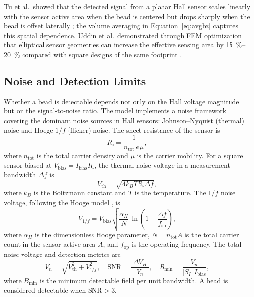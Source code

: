 \documentclass[micromachines,article,submit,pdftex,moreauthors]{Definitions/mdpi}
\begin{document}
Tu et al.\ showed that the detected signal from a planar Hall sensor scales linearly
with the sensor active area when the bead is centered but drops sharply when the
bead is offset laterally \cite{tu2009}; the volume averaging in
Equation~\eqref{eq:avgbz} captures this spatial dependence. Uddin et al.\
demonstrated through FEM optimization that elliptical sensor geometries can increase
the effective sensing area by \SIrange{15}{20}{\percent} compared with square
designs of the same footprint \cite{uddin2022}.

\subsection{Noise and Detection Limits}
\label{sec:noise}

Whether a bead is detectable depends not only on the Hall voltage magnitude but on
the signal-to-noise ratio. The model implements a noise framework covering the
dominant noise sources in Hall sensors: Johnson--Nyquist (thermal) noise and Hooge
$1/f$ (flicker) noise. The sheet resistance of the sensor is
\begin{equation}
R_\square = \frac{1}{n_\text{tot} \, e \, \mu},
\label{eq:rsq}
\end{equation}
where $n_\text{tot}$ is the total carrier density and $\mu$ is the carrier mobility.
For a square sensor biased at $V_\text{bias} = I_\text{bias} R_\square$, the thermal
noise voltage in a measurement bandwidth $\Delta f$ is
\begin{equation}
V_\text{th} = \sqrt{4 k_B T R_\square \Delta f},
\label{eq:thermal}
\end{equation}
where $k_B$ is the Boltzmann constant and $T$ is the temperature. The $1/f$ noise
voltage, following the Hooge model \cite{xu2013,huang2014}, is
\begin{equation}
V_{1/f} = V_\text{bias}\sqrt{\frac{\alpha_H}{N}\,
\ln\!\left(1 + \frac{\Delta f}{f_\text{op}}\right)},
\label{eq:flicker}
\end{equation}
where $\alpha_H$ is the dimensionless Hooge parameter,
$N = n_\text{tot} A$ is the total carrier count in the sensor active area $A$, and
$f_\text{op}$ is the operating frequency. The total noise voltage and detection
metrics are
\begin{equation}
V_n = \sqrt{V_\text{th}^2 + V_{1/f}^2}, \quad
\text{SNR} = \frac{|\Delta V_H|}{V_n}, \quad
B_\text{min} = \frac{V_n}{|S_I| \, I_\text{bias}},
\label{eq:snr}
\end{equation}
where $B_\text{min}$ is the minimum detectable field per unit bandwidth. A bead is
considered detectable when $\text{SNR} > 3$.
\end{document}
